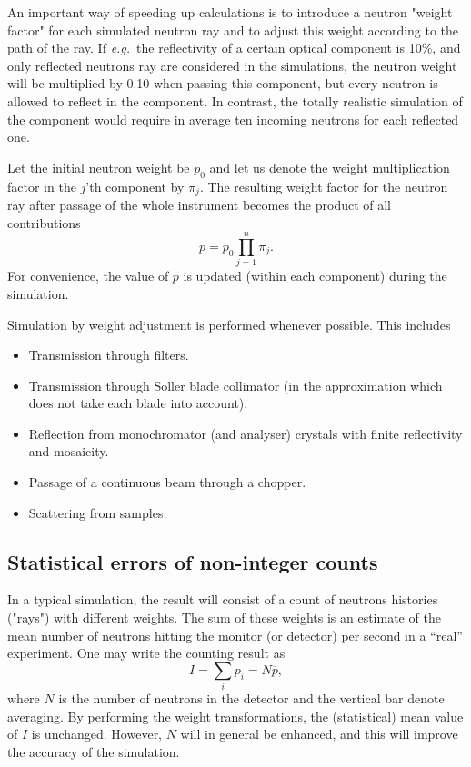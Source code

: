 An important way of speeding up calculations is to introduce
a neutron "weight factor" for each simulated neutron ray and to
adjust this weight according to the path of the ray.
If {\em e.g.}\ the reflectivity of a certain
optical component is 10\%, and only reflected neutrons ray are
considered in the simulations, the neutron
weight will be multiplied by 0.10 when passing this component,
but every neutron is allowed to reflect in the component.
In contrast, the totally realistic simulation of the component
would require in average ten incoming neutrons for each reflected one.

Let the initial neutron weight be $p_0$ and let us denote the weight
multiplication factor in the $j$'th component by $\pi_j$.  The resulting
weight factor for the neutron ray after passage of the whole instrument 
becomes the product of all contributions
\begin{equation}
\label{e:probprod}
p = p_0 \prod_{j=1}^n \pi_j .
\end{equation}
For convenience, the value of $p$ is updated (within each component) 
during the simulation.

Simulation by weight adjustment is performed
whenever possible. This includes
\begin{itemize}
\item Transmission through filters.
\item Transmission through Soller blade collimator
 (in the approximation
 which does not take each blade into account).
\item Reflection from monochromator (and analyser) crystals
 with finite reflectivity and mosaicity.
\item Passage of a continuous beam through a chopper.
\item Scattering from samples.
\end{itemize}

\subsection{Statistical errors of non-integer counts}
\label{s:staterror}

In a typical simulation, the result will consist of a
count of neutrons histories ("rays") with different weights. The
sum of these weights is an estimate of the mean number of neutrons 
hitting the monitor (or detector) per second in a ``real'' experiment.
One may write the counting result as
\begin{equation}
\label{psum}
I = \sum_i p_i = N \overline{p} ,
\end{equation}
where $N$ is the number of neutrons in the detector and the vertical bar 
denote averaging.
By performing the weight transformations, the (statistical)
mean value of $I$ is unchanged. However, $N$ will in general be enhanced,
and this will improve the accuracy of the simulation.

